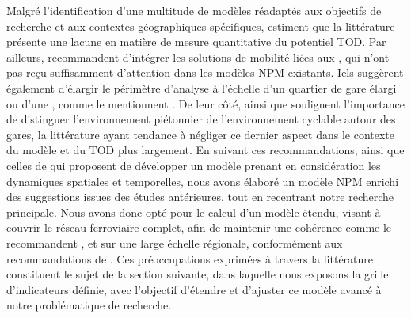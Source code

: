 \begin{refsegment}
Malgré l'identification d'une multitude de modèles réadaptés aux objectifs de recherche et aux contextes géographiques spécifiques, \textcolor{blue}{\textcite[394]{ibrahim_planning_2022}} estiment que la littérature présente une lacune en matière de mesure quantitative du potentiel \acrshort{TOD}. Par ailleurs, \textcolor{blue}{\textcite[10-12]{olaru_place_2019}} recommandent d'intégrer les solutions de mobilité liées aux , qui n'ont pas reçu suffisamment d'attention dans les modèles \acrshort{NPM} existants. Iels suggèrent également d'élargir le périmètre d'analyse à l'échelle d'un quartier de gare élargi ou d'une , comme le mentionnent \textcolor{blue}{\textcite[280]{li_transit_2019}}. De leur côté, \textcolor{blue}{\textcite[80]{robillard_transit-oriented_2024}} ainsi que \textcolor{blue}{\textcite[120]{nigro_land_2019}} soulignent l'importance de distinguer l'environnement piétonnier de l'environnement cyclable autour des gares, la littérature ayant tendance à négliger ce dernier aspect dans le contexte du modèle et du \acrshort{TOD} plus largement. En suivant ces recommandations, ainsi que celles de \textcolor{blue}{\textcite[9]{motieyan_development_2018}} qui proposent de développer un modèle prenant en considération les dynamiques spatiales et temporelles, nous avons élaboré un modèle \acrshort{NPM} enrichi des suggestions issues des études antérieures, tout en recentrant notre recherche principale. Nous avons donc opté pour le calcul d'un modèle étendu, visant à couvrir le réseau ferroviaire complet, afin de maintenir une cohérence comme le recommandent \textcolor{blue}{\textcite[58]{chorus_application_2011}}, et sur une large échelle régionale, conformément aux recommandations de \textcolor{blue}{\textcite[643]{wei_classifying_2023}}. Ces préoccupations exprimées à travers la littérature constituent le sujet de la section suivante, dans laquelle nous exposons la grille d'indicateurs définie, avec l'objectif d'étendre et d'ajuster ce modèle avancé à notre problématique de recherche.%


\end{refsegment}
